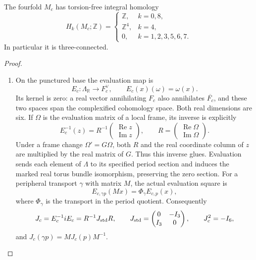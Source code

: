 \begin{theorem}\label{night:P1.12}
The fourfold $M_c$ has torsion-free integral homology
\[
H_k(M_c;\mathbb Z)=
\begin{cases}
\mathbb Z,&k=0,8,\\
\mathbb Z^4,&k=4,\\
0,&k=1,2,3,5,6,7.
\end{cases}
\]
In particular it is three-connected.
\end{theorem}
\begin{proof}
\begin{enumerate}[label=\arabic*.]
\item On the punctured base the evaluation map is
\[
 E_c:\Lambda_{\mathbb R}\longrightarrow F_c^\vee,
 \qquad E_c(x)(\omega)=\omega(x).
\]
Its kernel is zero: a real vector annihilating $F_c$ also annihilates
$\overline{F_c}$, and these two spaces span the complexified cohomology
space. Both real dimensions are six. If $\Omega$ is the evaluation
matrix of a local frame, its inverse is explicitly
\[
 E_c^{-1}(z)=R^{-1}
       \begin{pmatrix}\operatorname{Re}z\\\operatorname{Im}z\end{pmatrix},
 \qquad
 R=\begin{pmatrix}\operatorname{Re}\Omega\\\operatorname{Im}\Omega\end{pmatrix}.
\]
Under a frame change $\Omega'=G\Omega$, both $R$ and the real coordinate
column of $z$ are multiplied by the real matrix of $G$. Thus this
inverse glues. Evaluation sends each element of $\Lambda$ to its
specified period section and induces the marked real torus bundle
isomorphism, preserving the zero section. For a peripheral transport
$\gamma$ with matrix $M$, the actual evaluation square is
\[
 E_{c,\gamma p}(Mx)=\Phi_\gamma E_{c,p}(x),
\]
where $\Phi_\gamma$ is the transport in the period quotient. Consequently
\[
 J_c=E_c^{-1}iE_c=R^{-1}J_{\rm std}R,
 \qquad
 J_{\rm std}=\begin{pmatrix}0&-I_3\\I_3&0\end{pmatrix},
 \qquad J_c^2=-I_6,
\]
and $J_c(\gamma p)=M J_c(p)M^{-1}$.


\end{enumerate}
\end{proof}
